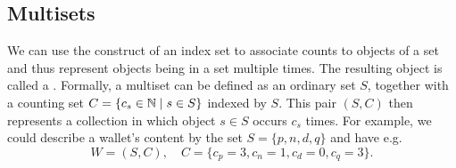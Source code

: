 \subsection{Multisets}
\label{secmultiset}

We can use the construct of an index set to associate counts to objects of a
set and thus represent objects being in a set multiple times. The resulting
object is called a . Formally, a multiset can be defined as
an ordinary set $S$, together with a counting set $C=\{c_s\in{\mathbb N}\mid s\in
S\}$ indexed by $S$. This pair $(S,C)$ then represents a collection in which
object $s\in S$ occurs  $c_s$ times. For example, we could describe a
wallet's content by the set $S=\{p,n,d,q\}$ 
and have e.g.
\[
W=(S,C),\quad C=\{c_p=3,c_n=1,c_d=0,c_q=3\}.
\]
